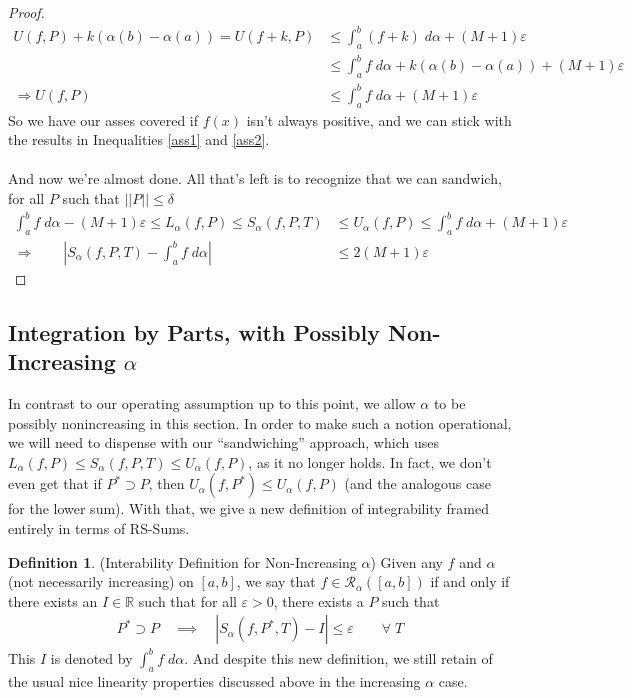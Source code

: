 \documentclass[12pt]{book}
\numberwithin{equation}{section} %
\theoremstyle{plain}
\theoremstyle{definition}
\newtheorem{defn}[thm]{Definition}
\theoremstyle{remark}
\begin{document}
\begin{proof}
\begin{align*}
    U(f,P) + k(\alpha(b)-\alpha(a))
        = U(f+k, P) &\leq \int^b_a (f+k)\; d\alpha
        + (M+1)\varepsilon \\
    &\leq \int^b_a f\; d\alpha  + k(\alpha(b)-\alpha(a))
        + (M+1)\varepsilon \\
    \Rightarrow U(f,P) &\leq \int^b_a f\; d\alpha
        + (M+1)\varepsilon
\end{align*}
So we have our asses covered if $f(x)$ isn't always positive, and we can
stick with the results in Inequalities \ref{ass1} and \ref{ass2}.
\\
\\
And now we're almost done.  All that's left is to recognize that we can
sandwich, for all $P$ such that $||P||\leq\delta$
\begin{align*}
    \int^b_a f\;d\alpha - (M+1)\varepsilon \leq
    L_\alpha(f,P) \leq S_\alpha(f,P,T) &\leq U_\alpha(f,P) \leq
   \int^b_a f\;d\alpha + (M+1)\varepsilon  \\
        \Rightarrow \qquad \left\lvert S_\alpha(f,P,T)
        - \int^b_a f\;d\alpha\right\rvert &\leq 2(M+1)\varepsilon \end{align*}
\end{proof}


\newpage
\subsection{Integration by Parts, with Possibly Non-Increasing $\alpha$}

In contrast to our operating assumption up to this point, we
allow $\alpha$ to be possibly nonincreasing in this section.
In order to make such a notion operational, we will need to dispense
with our ``sandwiching'' approach, which uses $L_\alpha(f,P)\leq
S_\alpha(f,P,T)\leq U_\alpha(f,P)$, as it no longer holds. In fact, we
don't even get that if $P^*\supset P$, then
$U_\alpha(f,P^*) \leq U_\alpha(f,P)$ (and the analogous case for the
lower sum). With that, we give a new definition of integrability framed
entirely in terms of RS-Sums.

\begin{defn}(Interability Definition for Non-Increasing $\alpha$)
Given any $f$ and $\alpha$ (not necessarily increasing) on $[a,b]$, we
say that $f\in\mathscr{R}_\alpha([a,b])$ if and only if there exists an
$I\in\mathbb{R}$ such that for all $\varepsilon>0$, there exists a $P$
such that
\begin{align}
  P^*\supset P
  \quad\implies\quad
  \left\lvert S_\alpha(f,P^*,T) - I \right\rvert \leq
  \varepsilon \qquad \forall \; T
  \label{intdefn}
\end{align}
This $I$ is denoted by $\int^b_a f\;d\alpha$. And despite this new
definition, we still retain of the usual nice linearity properties
discussed above in the increasing $\alpha$ case.
\end{defn}
\end{document}
